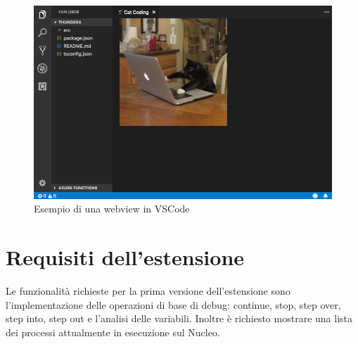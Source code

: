 \begin{figure}[H]
    \centering
    \includegraphics[width=0.7\columnwidth]{images/cat_coding.png}
    \caption{Esempio di una webview in VSCode}
    \label{fig:webcat}
\end{figure}

\section{Requisiti dell'estensione}
Le funzionalità richieste per la prima versione dell'estensione sono l'implementazione delle operazioni di base di debug: continue, stop, step over, step into, step out e l'analisi delle variabili. Inoltre è richiesto mostrare una lista dei processi attualmente in esecuzione sul Nucleo.
